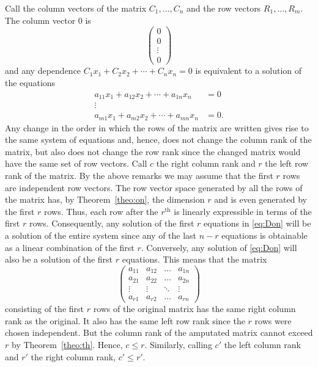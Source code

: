 \documentclass[11pt]{article}
\theoremstyle{definition}
\begin{document}
Call the column vectors of the matrix $C_1, \ldots, C_n$ and the row vectors $R_1, \ldots, R_m$.
The column vector $0$ is
\[
\begin{pmatrix}
0 \\ 0 \\ \vdots \\ 0
\end{pmatrix}
\]
and any dependence $C_1 x_1 + C_2 x_2 + \cdots + C_n x_n = 0$ is equivalent to a solution of the equations
\begin{equation}
\label{eq:Don}
\begin{aligned}
a_{11}x_1 + a_{12}x_2 + \cdots + a_{1n}x_n &= 0
\\
\vdots &
\\
a_{m1}x_1 + a_{m2}x_2 + \cdots + a_{mn}x_n &= 0.
\end{aligned}
\end{equation}
Any change in the order in which the rows of the matrix are written gives rise to the same system of equations and, hence, does not change the column rank of the matrix, but also does not change the row rank since the changed matrix would have the same set of row vectors.
Call $c$ the right column rank and $r$ the left row rank of the matrix.
By the above remarks we may assume that the first $r$ rows are independent row vectors.
The row vector space generated by all the rows of the matrix has, by Theorem~\ref{theo:on}, the dimension $r$ and is even generated by the first $r$ rows.
Thus, each row after the $r^{\text{th}}$ is linearly expressible in terms of the first $r$ rows.
Consequently, any solution of the first $r$ equations in \eqref{eq:Don} will be a solution of the entire system since any of the last $n-r$ equations is obtainable as a linear combination of the first $r$.
Conversely, any solution of \eqref{eq:Don} will also be a solution of the first $r$ equations.
This means that the matrix
\[
\begin{pmatrix}
a_{11} & a_{12} & \ldots & a_{1n}
\\
a_{21} & a_{22} & \ldots & a_{2n}
\\
\vdots & \vdots & \ddots & \vdots
\\
a_{r1} & a_{r2} & \ldots & a_{rn}
\end{pmatrix}
\]
consisting of the first $r$ rows of the original matrix has the same right column rank as the original.
It also has the same left row rank since the $r$ rows were chosen independent.
But the column rank of the amputated matrix cannot exceed $r$ by Theorem~\ref{theo:th}.
Hence, $c \leq r$.
Similarly, calling $c'$ the left column rank and $r'$ the right column rank, $c' \leq r'$.
\end{document}
